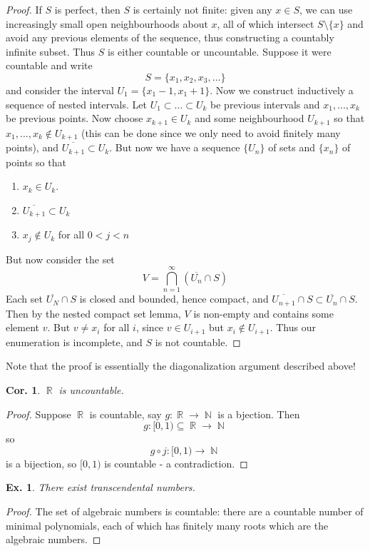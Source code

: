 \documentclass[12pt, a4paper]{book}
\DeclareMathOperator{\N}{\mathbb{N}}
\DeclareMathOperator{\R}{\mathbb{R}}
\newtheorem{corollary}[theorem]{Cor.}
\newtheorem{example}[theorem]{Ex.}
\theoremstyle{nonumberplain}
\newtheorem{proof}{Proof}
\begin{document}
\begin{proof}
    If $S$ is perfect, then $S$ is certainly not finite: given any $x\in S$, we can use increasingly small open
    neighbourhoods about $x$, all of which intersect $S\setminus\{x\}$ and avoid any previous elements of the sequence,
    thus constructing a countably infinite subset. Thus $S$ is either countable or uncountable. Suppose it were countable
    and write
    \[S=\{x_1,x_2,x_3,\ldots\}\]
    and consider the interval $U_1=\{x_1-1,x_1+1\}$. Now we construct inductively a sequence of nested intervals. Let
    $U_1\subset\ldots\subset U_k$ be previous intervals and $x_1,\ldots,x_k$ be previous points. Now choose $x_{k+1}\in U_k$
    and some neighbourhood $U_{k+1}$ so that $x_1,\ldots,x_k\notin U_{k+1}$ (this can be done since we only need to
    avoid finitely many points), and $\overline{U_{k+1}}\subset U_k$. But now we have a sequence $\{U_n\}$ of sets
    and $\{x_n\}$ of points so that
    \begin{enumerate}
        \item $x_k\in U_k$.
        \item $\overline{U_{k+1}}\subset U_k$
        \item $x_j\notin U_k$ for all $0<j<n$
    \end{enumerate}
    But now consider the set
    \[V=\bigcap_{n=1}^\infty \left( \overline{U_n}\cap S \right)\]
    Each set $\overline{U_N}\cap S$ is closed and bounded, hence compact, and $\overline{U_{n+1}}\cap S\subset\overline{U_{n}}\cap S$.
    Then by the nested compact set lemma, $V$ is non-empty and contains some element $v$. But $v\neq x_i$ for all $i$,
    since $v\in U_{i+1}$ but $x_i\notin U_{i+1}$. Thus our enumeration is incomplete, and $S$ is not countable.
\end{proof}
Note that the proof is essentially the diagonalization argument described above!
\begin{corollary}
    $\R$ is uncountable.
\end{corollary}
\begin{proof}
    Suppose $\R$ is countable, say $g:\R\to\N$ is a bjection. Then
    \[ g:[0,1)\subseteq\R\to\N\]
    so
    \[g\circ j:[0,1)\to\N\]
    is a bijection, so $[0,1)$ is countable - a contradiction.
\end{proof}
\begin{example}
    There exist transcendental numbers.
\end{example}
\begin{proof}
    The set of algebraic numbers is countable: there are a countable number of minimal polynomials, each of which has finitely many roots which are the algebraic numbers.
\end{proof}
\end{document}
